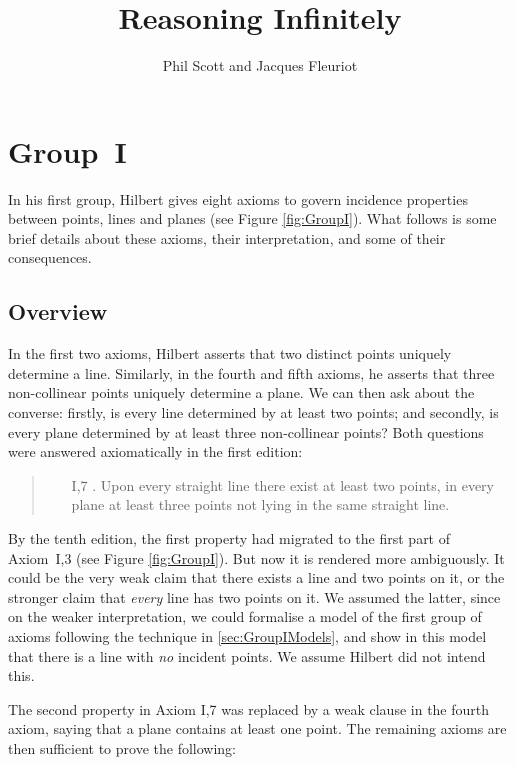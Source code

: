 \documentclass{article}
\author{Phil Scott and Jacques Fleuriot}
\title{Reasoning Infinitely}
\begin{document}
\maketitle

\section{Group~I}\label{sec:GroupI}
In his first group, Hilbert gives eight axioms to govern incidence properties between points, lines and planes (see Figure \ref{fig:GroupI}). What follows is some brief details about these axioms, their interpretation, and some of their consequences.

\subsection{Overview}
In the first two axioms, Hilbert asserts that two distinct points uniquely determine a line. Similarly, in the fourth and fifth axioms, he asserts that three non-collinear points uniquely determine a plane. We can then ask about the converse: firstly, is every line determined by at least two points; and secondly, is every plane determined by at least three non-collinear points? Both questions were answered axiomatically in the first edition:

\begin{quote}
  \begin{enumerate}
  \item[I,7]. Upon every straight line there exist at least two points, in every plane at least three points not lying in the same straight line.
  \end{enumerate}
\end{quote}

By the tenth edition, the first property had migrated to the first part of Axiom~I,3 (see Figure \ref{fig:GroupI}). But now it is rendered more ambiguously. It could be the very weak claim that there exists a line and two points on it, or the stronger claim that \emph{every} line has two points on it. We assumed the latter, since on the weaker interpretation, we could formalise a model of the first group of axioms following the technique in \ref{sec:GroupIModels}, and show in this model that there is a line with \emph{no} incident points. We assume Hilbert did not intend this. 

The second property in Axiom I,7 was replaced by a weak clause in the fourth axiom, saying that a plane contains at least one point. The remaining axioms are then sufficient to prove the following:
\end{document}
